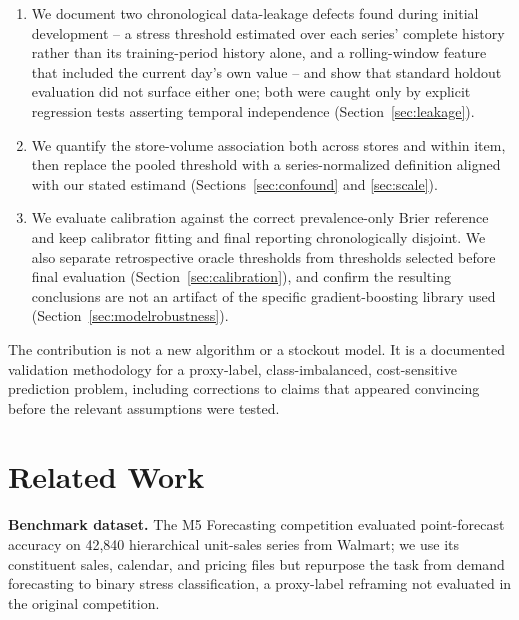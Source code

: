 \documentclass[11pt]{article}
\begin{document}
\begin{enumerate}[leftmargin=*]
    \item We document two chronological data-leakage defects found during initial development -- a stress threshold estimated over each series' complete history rather than its training-period history alone, and a rolling-window feature that included the current day's own value -- and show that standard holdout evaluation did not surface either one; both were caught only by explicit regression tests asserting temporal independence (Section~\ref{sec:leakage}).
    \item We quantify the store-volume association both across stores and within item, then replace the pooled threshold with a series-normalized definition aligned with our stated estimand (Sections~\ref{sec:confound} and \ref{sec:scale}).
    \item We evaluate calibration against the correct prevalence-only Brier reference and keep calibrator fitting and final reporting chronologically disjoint. We also separate retrospective oracle thresholds from thresholds selected before final evaluation (Section~\ref{sec:calibration}), and confirm the resulting conclusions are not an artifact of the specific gradient-boosting library used (Section~\ref{sec:modelrobustness}).
\end{enumerate}

The contribution is not a new algorithm or a stockout model. It is a documented validation methodology for a proxy-label, class-imbalanced, cost-sensitive prediction problem, including corrections to claims that appeared convincing before the relevant assumptions were tested.

\section{Related Work}

\textbf{Benchmark dataset.} The M5 Forecasting competition \citep{makridakis2022m5} evaluated point-forecast accuracy on 42{,}840 hierarchical unit-sales series from Walmart; we use its constituent sales, calendar, and pricing files but repurpose the task from demand forecasting to binary stress classification, a proxy-label reframing not evaluated in the original competition.
\end{document}
